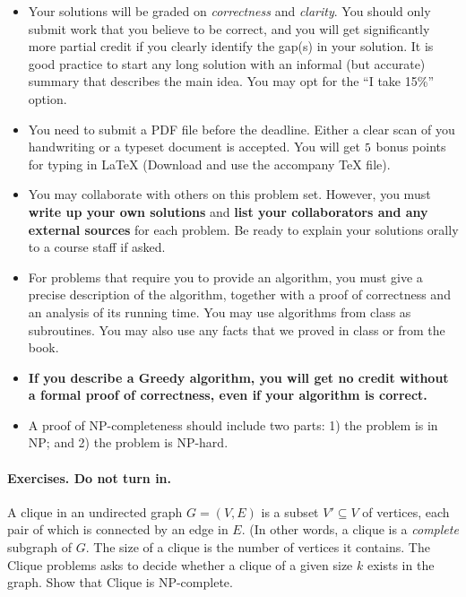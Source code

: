 \begin{itemize}
\item Your solutions will be graded on \emph{correctness} and
  \emph{clarity}. You should only submit work that you believe to be
  correct, and you will get significantly more partial credit if you
  clearly identify the gap(s) in your solution. It is good practice to
  start any long solution with an informal (but accurate) summary that
  describes the main idea. You may opt for the ``I take 15\%'' option.

\item You need to submit a PDF file before the deadline. Either a
  clear scan of you handwriting or a typeset document is accepted. You
  will get $5$ bonus points for typing in LaTeX (Download and use
  the accompany TeX file).

\item You may collaborate with others on this problem set. However,
  you must \textbf{{write up your own solutions}} and \textbf{{list
      your collaborators and any external sources}} for each
  problem. Be ready to explain your solutions orally to a course staff
  if asked.

\item For problems that require you to provide an algorithm, you must
  give a precise description of the algorithm, together with a proof
  of correctness and an analysis of its running time. You may use
  algorithms from class as subroutines. You may also use any facts
  that we proved in class or from the book.

\item \textbf{If you describe a Greedy algorithm, you will get no
    credit without a formal proof of correctness, even if your
    algorithm is correct.}

\item A proof of NP-completeness should include two parts: 1) the
    problem is in NP; and 2) the problem is NP-hard.

  \end{itemize}

  \paragraph{Exercises. Do not turn in.}
\begin{questions}
  \question A clique in an undirected graph $G =(V, E)$ is a subset
  $V' \subseteq V$ of vertices, each pair of which is connected by an
  edge in $E$. (In other words, a clique is a \emph{complete} subgraph
  of $G$. The size of a clique is the number of vertices it
  contains. The Clique problems asks to decide whether a clique of a
  given size $k$ exists in the graph. Show that Clique is NP-complete.
\end{questions}
\newpage 
